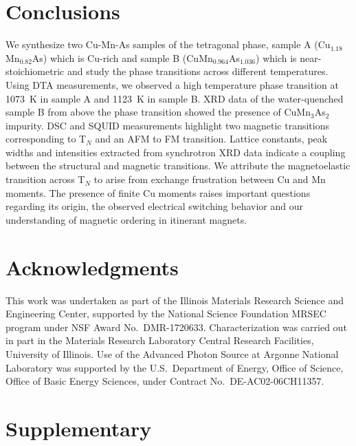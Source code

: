 \documentclass[letterpaper,10pt,doublespacing,edeposit]{uiucthesis2020}
\newcommand*{\cuexcess}{Cu$_{1.18}$Mn$_{0.82}$As}
\newcommand*{\asexcess}{CuMn$_{0.964}$As$_{1.036}$}
\begin{document}
\begin{mainmatter}
\section{Conclusions}
We synthesize two Cu-Mn-As samples of the tetragonal phase, sample A (\cuexcess) which is Cu-rich and sample B (\asexcess) which is near-stoichiometric and study the phase transitions across different temperatures. Using DTA measurements, we observed a high temperature phase transition at 1073~K in sample A and 1123~K in sample B. XRD data of the water-quenched sample B from above the phase transition showed the presence of CuMn$_3$As$_2$ impurity. DSC and SQUID measurements highlight two magnetic transitions corresponding to T$_N$ and an AFM to FM transition. Lattice constants, peak widths and intensities extracted from synchrotron XRD data indicate a coupling between the structural and magnetic transitions. We attribute the magnetoelastic transition across T$_N$ to arise from exchange frustration between Cu and Mn moments. The presence of finite Cu moments raises important questions regarding its origin, the observed electrical switching behavior and our understanding of magnetic ordering in itinerant magnets.



\section{Acknowledgments}
This work was undertaken as part of the Illinois Materials  Research  Science  and  Engineering  Center,  supported by the National Science Foundation MRSEC program under NSF Award No.\ DMR-1720633.
Characterization was carried out in part in the Materials Research Laboratory Central Research Facilities, University of Illinois. Use of the Advanced Photon Source at Argonne National Laboratory was supported by the U.S.\ Department of Energy, Office of Science, Office of Basic Energy Sciences, under Contract No.\ DE-AC02-06CH11357.

\section{Supplementary}



\end{mainmatter}
\end{document}
